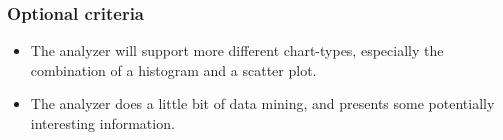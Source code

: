 \subsubsection{Optional criteria}
\begin{itemize}
\item The analyzer will support more different chart-types, especially the combination of
a histogram and a scatter plot. 
\item The analyzer does a little bit of data mining, and presents some potentially interesting information.
\end{itemize}






